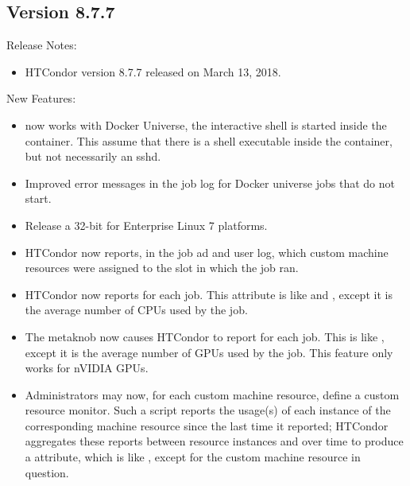 \subsection*{\label{sec:New-8-7-7}Version 8.7.7}

\noindent Release Notes:

\begin{itemize}

\item HTCondor version 8.7.7 released on March 13, 2018.

\end{itemize}


\noindent New Features:

\begin{itemize}

\item {} now works with Docker Universe, the interactive
shell is started inside the container.  This assume that there is a shell
executable inside the container, but not necessarily an sshd.

\item Improved error messages in the job log for Docker universe jobs
that do not start.

\item Release a 32-bit  for Enterprise Linux 7 platforms.

\item HTCondor now reports, in the job ad and user log, which custom machine
resources were assigned to the slot in which the job ran.

\item HTCondor now reports  for each job.  This attribute is
like  and , except it is the average number
of CPUs used by the job.

\item The  metaknob now causes HTCondor to report
 for each job.  This is like , except it is
the average number of GPUs used by the job.  This feature only works for
nVIDIA GPUs.

\item Administrators may now, for each custom machine resource, define a
custom resource monitor.  Such a script reports the usage(s) of each
instance of the corresponding machine resource since the last time it
reported; HTCondor aggregates these reports between resource instances and
over time to produce a  attribute, which is like
, except for the custom machine resource in question.


\end{itemize}
